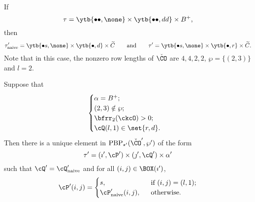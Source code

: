 \documentclass[ssunip]{subfiles}
\begin{document}
\begin{Example}
 If 
 \[
 \tau= \ytb{\bullet\bullet,\none} \times \ytb{\bullet \bullet, dd}\times 
  B^+,
 \]
 then 
\[
 \tau'_{\mathrm{naive}}= \ytb{\bullet s,\none} \times \ytb{\bullet, d}\times 
  \widetilde C\qquad\textrm{and}\qquad \tau'= \ytb{\bullet s,\none} \times \ytb{\bullet, r}\times 
  \widetilde C.
 \]
 Note that in this case, the nonzero row lengths of $\check \CO$ are $4,4,2,2$, $\wp=\{(2,3)\}$ and $l=2$.
\end{Example}
\begin{lem}\label{descb2}
  Suppose that 
\[  \begin{cases}
 \alpha = B^+; & \\
 (2,3)\notin \wp;\quad  &\\
 \bfrr_2(\ckcO)>0; & \\
 \cQ(l,1)\in \set{r,d}.
\end{cases}
\]
 Then there is a unique element in $\mathrm{PBP}_{\star'}(\check \CO',\wp')$ of the form
  \[
      \tau'=(\imath', \cP')\times (\jmath', \cQ')\times \alpha'
  \]
 such that 
     $
     \cQ' = \cQ'_{\mathrm{naive}}
     $
     and
     for all $(i,j)\in \BOX(\imath')$, 
\[
\cP'(i,j) = \begin{cases}
  s, & \ \text{ if $(i,j) = (l,1)$;}\\
  \cP'_{\mathrm{naive}}(i,j), & \ \text{ otherwise}.
\end{cases}
\]
\end{lem}
\end{document}
